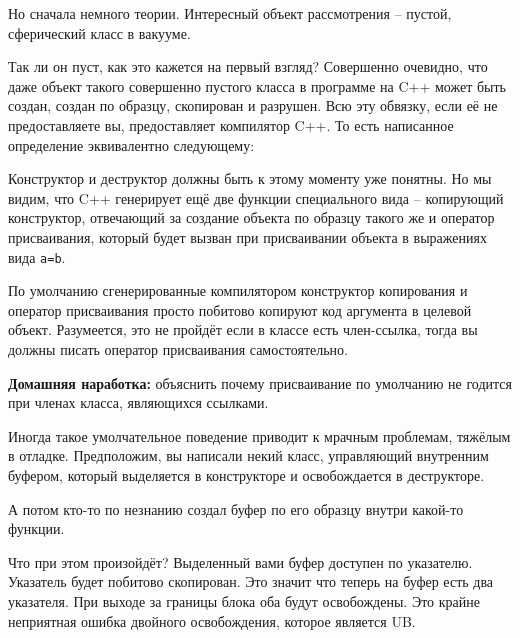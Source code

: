 \documentclass[a4paper,12pt,oneside]{article}
\begin{document}
Но сначала немного теории. Интересный объект рассмотрения -- пустой, сферический класс в вакууме.



Так ли он пуст, как это кажется на первый взгляд? Совершенно очевидно, что даже объект такого совершенно пустого класса в программе на C++ может быть создан, создан по образцу, скопирован и разрушен. Всю эту обвязку, если её не предоставляете вы, предоставляет компилятор C++. То есть написанное определение эквивалентно следующему:



Конструктор и деструктор должны быть к этому моменту уже понятны. Но мы видим, что C++ генерирует ещё две функции специального вида – копирующий конструктор, отвечающий за создание объекта по образцу такого же и оператор присваивания, который будет вызван при присваивании объекта в выражениях вида \lstinline!a=b!.



По умолчанию сгенерированные компилятором конструктор копирования и оператор присваивания просто побитово копируют код аргумента в целевой объект. Разумеется, это не пройдёт если в классе есть член-ссылка, тогда вы должны писать оператор присваивания самостоятельно.

\textbf{Домашняя наработка:} объяснить почему присваивание по умолчанию не годится при членах класса, являющихся ссылками.

Иногда такое умолчательное поведение приводит к мрачным проблемам, тяжёлым в отладке. Предположим, вы написали некий класс, управляющий внутренним буфером, который выделяется в конструкторе и освобождается в деструкторе.



А потом кто-то по незнанию создал буфер по его образцу внутри какой-то функции.



Что при этом произойдёт? Выделенный вами буфер доступен по указателю. Указатель будет побитово скопирован. Это значит что теперь на буфер есть два указателя. При выходе за границы блока оба будут освобождены. Это крайне неприятная ошибка двойного освобождения, которое является UB.
\end{document}
